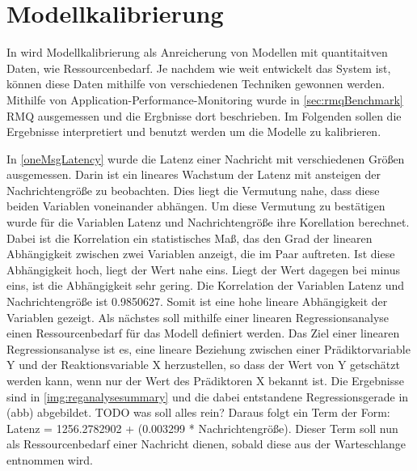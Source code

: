 \section{Modellkalibrierung}
\label{sec:rmqRd}
In \cite{palladio17} wird Modellkalibrierung als Anreicherung von Modellen mit quantitaitven Daten, wie Ressourcenbedarf. Je nachdem wie weit entwickelt das System ist, können diese Daten mithilfe von verschiedenen Techniken gewonnen werden. Mithilfe von Application-Performance-Monitoring wurde in \autoref{sec:rmqBenchmark} RMQ ausgemessen und die Ergbnisse dort beschrieben. Im Folgenden sollen die Ergebnisse interpretiert und benutzt werden um die Modelle zu kalibrieren.

In \autoref{oneMsgLatency} wurde die Latenz einer Nachricht mit verschiedenen Größen ausgemessen. Darin ist ein lineares Wachstum der Latenz mit ansteigen der Nachrichtengröße zu beobachten. Dies liegt die Vermutung nahe, dass diese beiden Variablen voneinander abhängen. Um diese Vermutung zu bestätigen wurde für die Variablen Latenz und Nachrichtengröße ihre Korellation berechnet. Dabei ist die Korrelation ein statistisches Maß, das den Grad der linearen Abhängigkeit zwischen zwei Variablen anzeigt, die im Paar auftreten. Ist diese Abhängigkeit hoch, liegt der Wert nahe eins. Liegt der Wert dagegen bei minus eins, ist die Abhängigkeit sehr gering. Die Korrelation der Variablen Latenz und Nachrichtengröße ist 0.9850627. Somit ist eine hohe lineare Abhängigkeit der Variablen gezeigt. Als nächstes soll mithilfe einer linearen Regressionsanalyse einen Ressourcenbedarf für das Modell definiert werden. Das Ziel einer linearen Regressionsanalyse ist es, eine lineare Beziehung zwischen einer Prädiktorvariable Y und der Reaktionsvariable X herzustellen, so dass der Wert von Y getschätzt werden kann, wenn nur der Wert des Prädiktoren X bekannt ist. Die Ergebnisse sind in \autoref{img:reganalysesummary} und die dabei entstandene Regressionsgerade in (abb) abgebildet. TODO was soll alles rein?
Daraus folgt ein Term der Form: Latenz = 1256.2782902 + (0.003299 * Nachrichtengröße). Dieser Term soll nun als Ressourcenbedarf einer Nachricht dienen, sobald diese aus der Warteschlange entnommen wird. 
